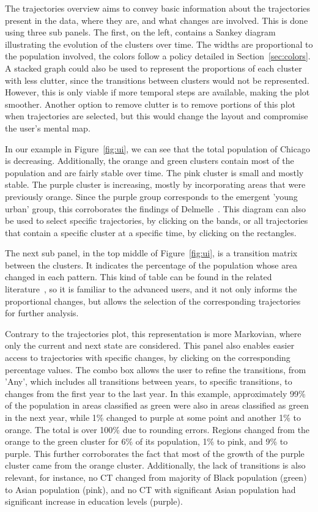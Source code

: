 The trajectories overview aims to convey basic information about the
trajectories present in the data, where they are, and what changes are involved.
This is done using three sub panels. The first, on the left, contains a Sankey
diagram illustrating the evolution of the clusters over time. The widths are
proportional to the population involved, the colors follow a policy detailed in
Section~\ref{sec:colors}. A stacked graph could also be used to represent the
proportions of each cluster~\cite{Valdivia2015} with less clutter, since the
transitions between clusters would not be represented. However, this is only
viable if more temporal steps are available, making the plot smoother. Another
option to remove clutter is to remove portions of this plot when trajectories
are selected, but this would change the layout and compromise the user's mental
map.


In our example in Figure~\ref{fig:ui}, we can see that the total population of
Chicago is decreasing. Additionally, the orange and green clusters contain most
of the population and are fairly stable over time. The pink cluster is small and
mostly stable. The purple cluster is increasing, mostly by incorporating areas
that were previously orange. Since the purple group corresponds to the emergent
'young urban' group, this corroborates the findings of
Delmelle~\cite{Delmelle2016,Delmelle2017}. This diagram can also be used to
select specific trajectories, by clicking on the bands, or all trajectories that
contain a specific cluster at a specific time, by clicking on the rectangles.


The next sub panel, in the top middle of Figure~\ref{fig:ui}, is a transition
matrix between the clusters. It indicates the percentage of the population whose
area changed in each pattern. This kind of table can be found in the related
literature~\cite{Delmelle2016}, so it is familiar to the advanced users, and it
not only informs the proportional changes, but allows the selection of the
corresponding trajectories for further analysis.

Contrary to the trajectories plot, this representation is more Markovian, where
only the current and next state are considered. This panel also enables easier
access to trajectories with specific changes, by clicking on the corresponding
percentage values. The combo box allows the user to refine the transitions, from
'Any', which includes all transitions between years, to specific transitions, to
changes from the first year to the last year. In this example, approximately
99\% of the population in areas classified as green were also in areas
classified as green in the next year, while 1\% changed to purple at some point
and another 1\% to orange. The total is over 100\% due to rounding errors.
Regions changed from the orange to the green cluster for 6\% of its population,
1\% to pink, and 9\% to purple. This further corroborates the fact that most of
the growth of the purple cluster came from the orange cluster. Additionally, the
lack of transitions is also relevant, for instance, no CT changed from majority
of Black population (green) to Asian population (pink), and no CT with
significant Asian population had significant increase in education levels
(purple).

